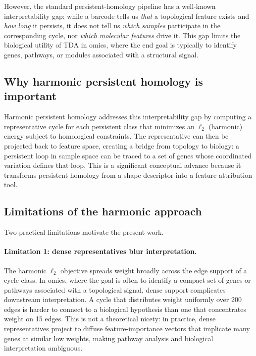 \documentclass[11pt]{article}
\begin{document}
However, the standard persistent-homology pipeline has a well-known interpretability gap: while a barcode tells us \emph{that} a topological feature exists and \emph{how long} it persists, it does not tell us \emph{which samples} participate in the corresponding cycle, nor \emph{which molecular features} drive it.
This gap limits the biological utility of TDA in omics, where the end goal is typically to identify genes, pathways, or modules associated with a structural signal.

\subsection{Why harmonic persistent homology is important}

Harmonic persistent homology \cite{basuCoxHPH2024, gurnariHPH2025} addresses this interpretability gap by computing a representative cycle for each persistent class that minimizes an $\ell_2$ (harmonic) energy subject to homological constraints.
The representative can then be projected back to feature space, creating a bridge from topology to biology: a persistent loop in sample space can be traced to a set of genes whose coordinated variation defines that loop.
This is a significant conceptual advance because it transforms persistent homology from a shape descriptor into a feature-attribution tool.

\subsection{Limitations of the harmonic approach}

Two practical limitations motivate the present work.

\paragraph{Limitation 1: dense representatives blur interpretation.}
The harmonic $\ell_2$ objective spreads weight broadly across the edge support of a cycle class.
In omics, where the goal is often to identify a compact set of genes or pathways associated with a topological signal, dense support complicates downstream interpretation.
A cycle that distributes weight uniformly over 200 edges is harder to connect to a biological hypothesis than one that concentrates weight on 15 edges.
This is not a theoretical nicety: in practice, dense representatives project to diffuse feature-importance vectors that implicate many genes at similar low weights, making pathway analysis and biological interpretation ambiguous.
\end{document}
